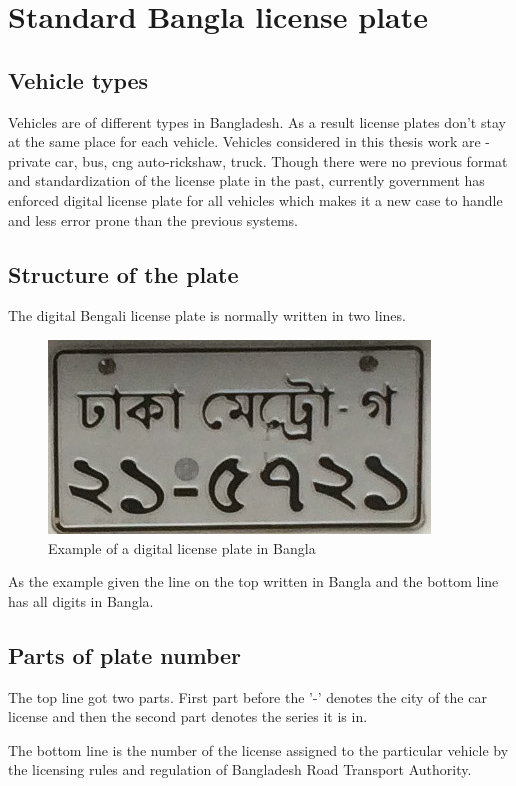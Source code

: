 \section{Standard Bangla license plate}
\subsection{Vehicle types}
Vehicles are of different types in Bangladesh. As a result license plates don't stay at the same place for each vehicle.
Vehicles considered in this thesis work are - private car, bus, cng auto-rickshaw, truck. Though there were no previous format and standardization of the license plate in the past, currently government has enforced digital license plate for all vehicles which makes it a new case to handle and less error prone than the previous systems.

\subsection{Structure of the plate}
The digital Bengali license plate is normally written in two lines.

    \begin{figure}[ht]
    \centering
    \includegraphics[scale=0.8]{./img/sample_plate}
    \caption{Example of a digital license plate in Bangla}
	\label{fig:EX}
    \end{figure}

\par
As the example given the line on the top written in Bangla and the bottom line has all digits in Bangla.    

\subsection{Parts of plate number}
The top line got two parts. First part before the '-' denotes the city of the car license and then the second part denotes the series it is in.

The bottom line is the number of the license assigned to the particular vehicle by the licensing rules and regulation of Bangladesh Road Transport Authority.

